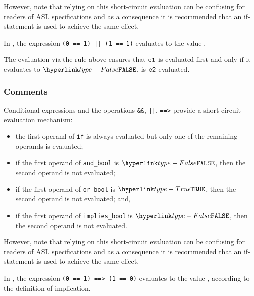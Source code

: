 However, note that relying on this short-circuit evaluation can be confusing
for readers of ASL specifications and as a consequence it is recommended that
an if-statement is used to achieve the same effect.

In , the expression \texttt{(0 == 1) || (1 == 1)} evaluates to the value \True.


The evaluation via the rule above ensures that $\texttt{e1}$ is evaluated first and only if
it evaluates to $\False$, is $\texttt{e2}$ evaluated.

\subsubsection{Comments}


Conditional expressions and the operations \texttt{\&\&}, \texttt{||},
\texttt{==>} provide a short-circuit evaluation mechanism:

\begin{itemize}
\item the first operand of \texttt{if} is always evaluated but only one of the
remaining operands is evaluated;
\item if the first operand of \texttt{and\_bool} is $\False$, then the second operand is not evaluated;
\item if the first operand of \texttt{or\_bool} is $\True$, then the second operand is not evaluated; and,
\item if the first operand of \texttt{implies\_bool} is $\False$, then the
second operand is not evaluated.
\end{itemize}

However, note that relying on this short-circuit evaluation can be confusing
for readers of ASL specifications and as a consequence it is recommended that
an if-statement is used to achieve the same effect.

In ,
the expression \texttt{(0 == 1) ==> (1 == 0)} evaluates to the value \True, according to the definition of implication.

